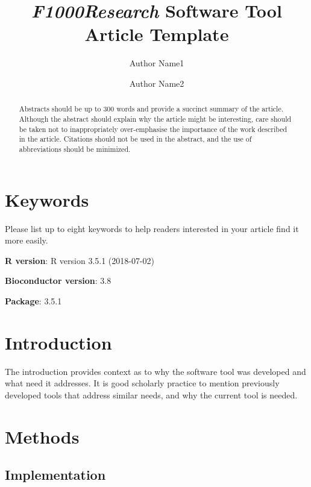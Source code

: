 \documentclass[9pt,a4paper,]{extarticle}
\begin{document}
\pagestyle{front}

\title{\emph{F1000Research} Software Tool Article Template}

\author[1]{Author Name1}
\author[2]{Author Name2}

\maketitle
\thispagestyle{front}

\begin{abstract}
Abstracts should be up to 300 words and provide a succinct summary of the article. Although the abstract should explain why the article might be interesting, care should be taken not to inappropriately over-emphasise the importance of the work described in the article. Citations should not be used in the abstract, and the use of abbreviations should be minimized.
\end{abstract}

\section*{Keywords}
Please list up to eight keywords to help readers interested in your article find it more easily.


\clearpage
\pagestyle{main}

\textbf{R version}: R version 3.5.1 (2018-07-02)

\textbf{Bioconductor version}: 3.8

\textbf{Package}: 3.5.1

\hypertarget{introduction}{%
\section{Introduction}\label{introduction}}

The introduction provides context as to why the software tool was developed and what need it addresses. It is good scholarly practice to mention previously developed tools that address similar needs, and why the current tool is needed.

\hypertarget{methods}{%
\section{Methods}\label{methods}}

\hypertarget{implementation}{%
\subsection{Implementation}\label{implementation}}
\end{document}
